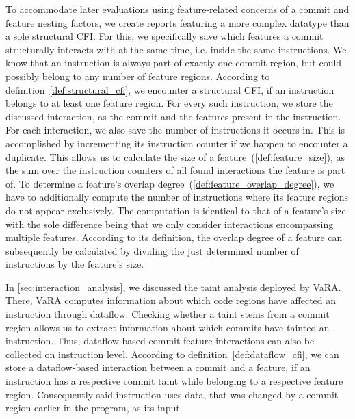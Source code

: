 To accommodate later evaluations using feature-related concerns of a commit and feature nesting factors, we create reports featuring a more complex datatype than a sole structural CFI.
For this, we specifically save which features a commit structurally interacts with at the same time, i.e. inside the same instructions.
We know that an instruction is always part of exactly one commit region, but could possibly belong to any number of feature regions.
According to definition~\ref{def:structural_cfi}, we encounter a structural CFI, if an instruction belongs to at least one feature region.
For every such instruction, we store the discussed interaction, as the commit and the features present in the instruction.
For each interaction, we also save the number of instructions it occurs in. 
This is accomplished by incrementing its instruction counter if we happen to encounter a duplicate. 
This allows us to calculate the size of a feature~(\ref{def:feature_size}), as the sum over the instruction counters of all found interactions the feature is part of.
To determine a feature's overlap degree~(\ref{def:feature_overlap_degree}), we have to additionally compute the number of instructions where its feature regions do not appear exclusively.
The computation is identical to that of a feature's size with the sole difference being that we only consider interactions encompassing multiple features.
According to its definition, the overlap degree of a feature can subsequently be calculated by dividing the just determined number of instructions by the feature's size.

In \autoref{sec:interaction_analysis}, we discussed the taint analysis deployed by VaRA.
There, VaRA computes information about which code regions have affected an instruction through dataflow.
Checking whether a taint stems from a commit region allows us to extract information about which commits have tainted an instruction.
Thus, dataflow-based commit-feature interactions can also be collected on instruction level.
According to definition~\ref{def:dataflow_cfi}, we can store a dataflow-based interaction between a commit and a feature, if an instruction has a respective commit taint while belonging to a respective feature region.
Consequently said instruction uses data, that was changed by a commit region earlier in the program, as its input. 

